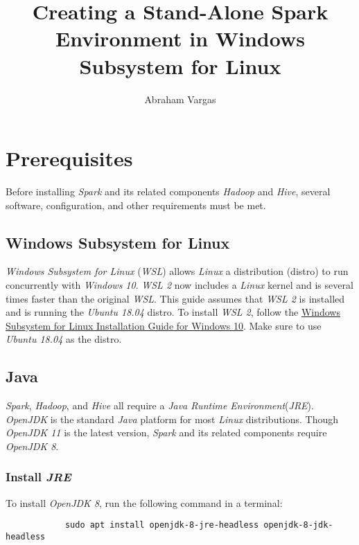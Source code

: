 \documentclass{article}
\begin{document}
\title{Creating a Stand-Alone Spark Environment in Windows Subsystem for Linux}
\author{Abraham Vargas}
\maketitle

\newpage
\tableofcontents
\newpage

\section{Prerequisites}
Before installing \emph{Spark} and its related components \emph{Hadoop} and \emph{Hive}, several
software, configuration, and other requirements must be met.

    \subsection{Windows Subsystem for Linux}
    \emph{Windows Subsystem for Linux} (\emph{WSL}) allows \emph{Linux} a distribution (distro) to
    run concurrently with \emph{Windows 10}. \emph{WSL 2} now includes a \emph{Linux}
    kernel and is several times faster than the original \emph{WSL}. This guide assumes that \emph{WSL 2}
    is installed and is running the \emph{Ubuntu 18.04} distro. To install \emph{WSL 2}, follow the
    \href{https://docs.microsoft.com/en-us/windows/wsl/install-win10}{Windows Subsystem for Linux Installation
    Guide for Windows 10}. Make sure to use \emph{Ubuntu 18.04} as the distro.

    \subsection{Java}
    \emph{Spark}, \emph{Hadoop}, and \emph{Hive} all require a \emph{Java Runtime Environment}(\emph{JRE}).
    \emph{OpenJDK} is the standard \emph{Java} platform for most \emph{Linux} distributions. Though \emph{OpenJDK 11}
    is the latest version, \emph{Spark} and its related components require \emph{OpenJDK 8}.

        \subsubsection{Install \emph{JRE}}
        To install \emph{OpenJDK 8}, run the following command in a terminal:
        \begin{verbatim}
            sudo apt install openjdk-8-jre-headless openjdk-8-jdk-headless  
        \end{verbatim}
\end{document}
